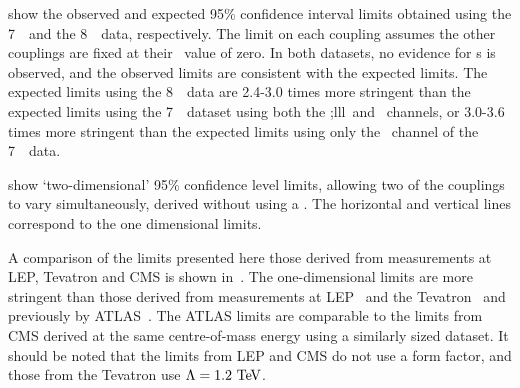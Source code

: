  show the observed and
expected 95\% confidence interval limits obtained using the 7~\tev\ and the
8~\tev\ data, respectively. The limit on each coupling assumes the other
couplings are fixed at their \sm\ value of zero. In both datasets, no evidence
for \TGC s is observed, and the observed limits are consistent with the expected
limits. The expected limits using the 8~\tev\ data are 2.4-3.0 times more
stringent than the expected limits using the 7~\tev\ dataset using both the
\ZZ;lll\ and \ZZllvv\ channels, or 3.0-3.6 times more stringent than the
expected limits using only the \ZZllll\ channel of the 7~\tev\ data.

 show `two-dimensional' 95\%
confidence level limits, allowing two of the couplings to vary simultaneously,
derived without using a \formfactor. The horizontal and vertical lines
correspond to the one dimensional limits.

A comparison of the limits presented here those derived from measurements at
LEP, Tevatron and CMS is shown in~.  The one-dimensional
limits are more stringent than those derived from measurements at
LEP~\cite{bib:LEPEW2006} and the Tevatron~\cite{bib:D0_ZZ1} and previously by
ATLAS~\cite{ATLAS_ZZ4l:1fb2011}. The ATLAS  limits are comparable to
the limits from CMS derived at the same centre-of-mass energy using a similarly
sized dataset. It should be noted that the limits from LEP and CMS do not use a
form factor, and those from the Tevatron use $\Lambda = 1.2\TeV$.

